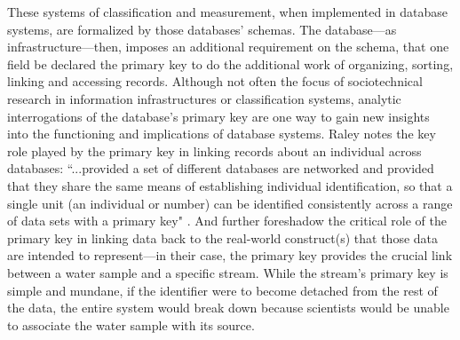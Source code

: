 These systems of classification and measurement, when implemented in database systems, are formalized by those databases' schemas. The database---as infrastructure---then, imposes an additional requirement on the schema, that one field be declared the primary key to do the additional work of organizing, sorting, linking and accessing records. Although not often the focus of sociotechnical research in information infrastructures or classification systems, analytic interrogations of the database's primary key are one way to gain new insights into the functioning and implications of database systems. Raley notes the key role played by the primary key in linking records about an individual across databases: ``...provided a set of different databases are networked and provided that they share the same means of establishing individual identification, so that a single unit (an individual or number) can be identified consistently across a range of data sets with a primary key" \citep{Raley2013Dataveillance}. And \citet{Ribes2013DataBite} further foreshadow the critical role of the primary key in linking data back to the real-world construct(s) that those data are intended to represent---in their case, the primary key provides the crucial link between a water sample and a specific stream. While the stream's primary key is simple and mundane, if the identifier were to become detached from the rest of the data, the entire system would break down because scientists would be unable to associate the water sample with its source.

